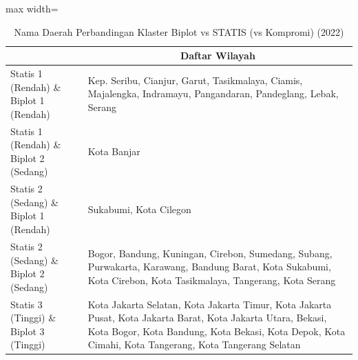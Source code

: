 \begin{table}[H]
\centering
\caption{Nama Daerah Perbandingan Klaster Biplot vs STATIS (vs Kompromi) (2022)} \label{tab:app1biplot_statis_name_2022}
\begin{adjustbox}{max width=\textwidth}
\begin{tabular}{|>{\centering\arraybackslash}p{4cm}|p{10cm}|}
\hline
\multicolumn{1}{|c|}{\textbf{Kategori}} & \multicolumn{1}{c|}{\textbf{Daftar Wilayah}} \\
\hline
Statis 1 (Rendah) \& Biplot 1 (Rendah) & Kep. Seribu, Cianjur, Garut, Tasikmalaya, Ciamis, Majalengka, Indramayu, Pangandaran, Pandeglang, Lebak, Serang \\
\hline
Statis 1 (Rendah) \& Biplot 2 (Sedang) & Kota Banjar \\
\hline
Statis 2 (Sedang) \& Biplot 1 (Rendah) & Sukabumi, Kota Cilegon \\
\hline
Statis 2 (Sedang) \& Biplot 2 (Sedang) & Bogor, Bandung, Kuningan, Cirebon, Sumedang, Subang, Purwakarta, Karawang, Bandung Barat, Kota Sukabumi, Kota Cirebon, Kota Tasikmalaya, Tangerang, Kota Serang \\
\hline
Statis 3 (Tinggi) \& Biplot 3 (Tinggi) & Kota Jakarta Selatan, Kota Jakarta Timur, Kota Jakarta Pusat, Kota Jakarta Barat, Kota Jakarta Utara, Bekasi, Kota Bogor, Kota Bandung, Kota Bekasi, Kota Depok, Kota Cimahi, Kota Tangerang, Kota Tangerang Selatan \\
\hline
\end{tabular}
\end{adjustbox}
\end{table}